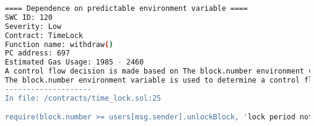\begin{lstlisting}[language=bash, caption="Mythril output for the time lock contract"]
==== Dependence on predictable environment variable ====
SWC ID: 120
Severity: Low
Contract: TimeLock
Function name: withdraw()
PC address: 697
Estimated Gas Usage: 1985 - 2460
A control flow decision is made based on The block.number environment variable.
The block.number environment variable is used to determine a control flow decision. Note that the values of variables like coinbase, gaslimit, block number and timestamp are predictable and can be manipulated by a malicious miner. Also keep in mind that attackers know hashes of earlier blocks. Don't use any of those environment variables as sources of randomness and be aware that use of these variables introduces a certain level of trust into miners.
--------------------
In file: /contracts/time_lock.sol:25

require(block.number >= users[msg.sender].unlockBlock, 'lock period not over')
\end{lstlisting}